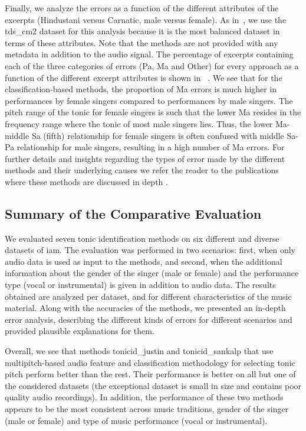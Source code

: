 {Finally, we analyze the errors as a function of the different attributes of the excerpts (Hindustani versus Carnatic, male versus female). As in~, we use the \acrshort{tds_cm2} dataset for this analysis because it is the most balanced dataset in terms of these attributes. Note that the methods are not provided with any metadata in addition to the audio signal. The percentage of excerpts containing each of the three categories of errors (Pa, Ma and Other) for every approach as a function of the different excerpt attributes is shown in ~. We see that for the classification-based methods, the proportion of Ma errors is much higher in performances by female singers compared to performances by male singers. The pitch range of the tonic for female singers is such that the lower Ma resides in the frequency range where the tonic of most male singers lies. Thus, the lower Ma-middle Sa (fifth) relationship for female singers is often confused with middle Sa-Pa relationship for male singers, resulting in a high number of Ma errors. For further details and insights regarding the types of error made by the
different methods and their underlying causes we refer the reader to the publications where these methods are discussed in depth \citep{salamon2012multipitch, SGulati_MThesis2012,bellur2012knowledge,ranjani2011carnatic}.


\subsection{Summary of the Comparative Evaluation }
\label{sec:pre_processing_tonic_identification_summary}

We evaluated seven tonic identification methods on six different and diverse datasets of \gls{iam}. The evaluation was performed in two scenarios: first, when only audio data is used as input to the methods, and second, when the additional information about the gender of the singer (male or female) and the performance type (vocal or instrumental) is given in addition to audio data. The results obtained are analyzed per dataset, and for different characteristics of the music material. Along with the accuracies of the methods, we presented an in-depth error analysis, describing the different kinds of errors for different scenarios and provided plausible explanations for them.

Overall, we see that methods \acrshort{tonicid_justin} and \acrshort{tonicid_sankalp} that use multipitch-based audio feature and classification methodology for selecting tonic pitch perform better than the rest. Their performance is better on all but one of the considered datasets (the exceptional dataset is small in size and contains poor quality audio recordings). In addition, the performance of these two methods appears to be the most consistent across music traditions, gender of the singer (male or female) and type of music performance (vocal or instrumental). 

}
